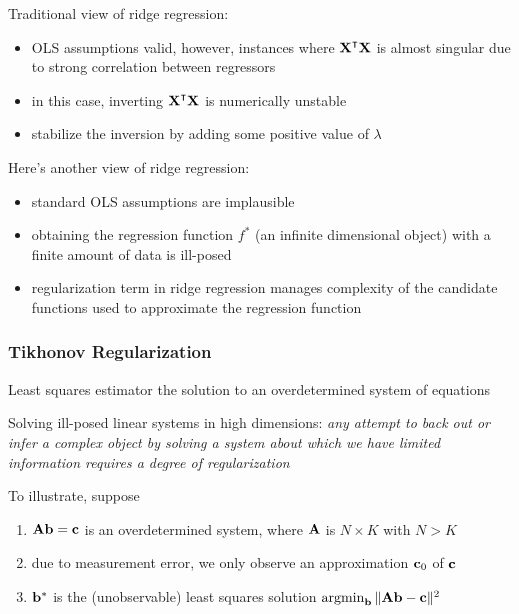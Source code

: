 \begin{frame}

    \vspace{2em}
    Traditional view of ridge regression:
    \begin{itemize}
        \item OLS assumptions valid, however,
    instances where $\boldX^\T \boldX$ is almost singular due to strong
    correlation between regressors
    \item in this case, inverting
    $\boldX^\T \boldX$ is numerically unstable
    \item stabilize the inversion by
        adding some positive value of $\lambda$
    \end{itemize}
    
\end{frame}

\begin{frame}
    
    \vspace{2em}
    Here's another view of ridge regression:
    \begin{itemize}
        \item standard OLS assumptions are implausible
        \item obtaining the regression function $f^*$ (an infinite dimensional object)
        with a finite amount of data is ill-posed
        \item regularization term in ridge regression manages complexity of the
            candidate functions used to approximate the regression function
    \end{itemize}
    

\end{frame}
    

\begin{frame}\frametitle{Tikhonov Regularization}

    \vspace{2em}
    Least squares estimator  the solution to an overdetermined
    system of equations
    
    Solving ill-posed
    linear systems in high dimensions: \emph{any attempt to back
    out or infer a complex object by solving a system about which we have limited
    information requires a degree of regularization}
    
    \vspace{.7em}
    To illustrate, suppose 
    \begin{enumerate}
        \item $\mathbf A {\mathbf b} = {\mathbf c}$ is an overdetermined system, where $\mathbf A$
            is $N \times K$ with $N > K$
        \item due to measurement error, we only observe an approximation
            ${\mathbf c}_0$ of ${\mathbf c}$
        \item ${\mathbf b}^*$ is the (unobservable) least squares solution $\argmin_{\boldb} \| \boldA \boldb - \boldc \|^2$
    \end{enumerate}

\end{frame}

